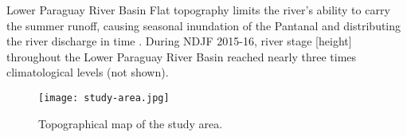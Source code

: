\begin{block}{Lower Paraguay River Basin}
  Flat topography limits the river's ability to carry the summer runoff, causing seasonal inundation of the Pantanal and distributing the river discharge in time \cite{Bravo:2011et,Barros:2004bn}.
  During NDJF 2015-16, river stage [height] throughout the Lower Paraguay River Basin reached nearly three times climatological levels (not shown).
  \begin{mdframed}
  \begin{figure}
  	\noindent\texttt{[image: study-area.jpg]}
  	\caption{
  		Topographical map of the study area.
  	}
    \label{fig:study-area}
  \end{figure}
  \end{mdframed}
\end{block}
